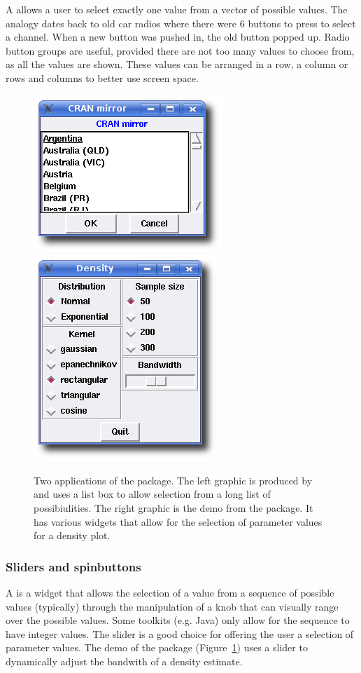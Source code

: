 A  allows a user to select exactly one value from a
vector of possible values. The analogy dates back to old car radios
where there were 6 buttons to press to select a channel. When a new
button was pushed in, the old button popped up. Radio button groups
are useful, provided there are not too many values to choose from, as
all the values are shown. These values can be arranged in a row, a
column or rows and columns to better use screen space.

\begin{figure}
  \centering
  \includegraphics[width=.35\textwidth]{ex-listbox}
  \includegraphics[width=.35\textwidth]{tcltk-tkdensity}
  \caption{
    Two applications of the  package. 
    The left graphic is
    produced by  and uses a list box to
    allow selection from a long list of possibiulities.
    The right graphic is the  demo from the
    package. It has various widgets that allow for the selection of
    parameter values for a density plot.
  }
  \label{fig:GUI:ex-tcltk}
\end{figure}

\subsubsection{Sliders and spinbuttons}
\label{sec:GUI:sliders}

A  is a widget that allows the selection of a value from a
sequence of possible values (typically) through the manipulation of a
knob that can visually range over the possible values. Some toolkits
(e.g. Java) only allow for the sequence to have integer values. The
slider is a good choice for offering the user a selection of parameter
values. The  demo of the  package
(Figure~\ref{fig:GUI:ex-tcltk}) uses a slider to dynamically adjust the
bandwith of a density estimate.



